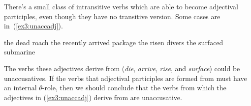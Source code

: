 There's a small class of intransitive verbs which are able to become adjectival participles, even though they have no transitive version. Some cases are in~(\ref{ex3:unaccadj}).
\begin{exe}
\raggedright
	\ex \label{ex3:unaccadj}
	\begin{xlist}
		\ex the dead roach
		\ex the recently arrived package
		\ex the risen divers
		\ex the surfaced submarine
	\end{xlist}
\end{exe}
The verbs these adjectives derive from (\textit{die}, \textit{arrive}, \textit{rise}, and \textit{surface}) could be unaccusatives. If the verbs that adjectival participles are formed from must have an internal $\theta$-role, then we should conclude that the verbs from which the adjectives in (\ref{ex3:unaccadj}) derive from are unaccusative.

